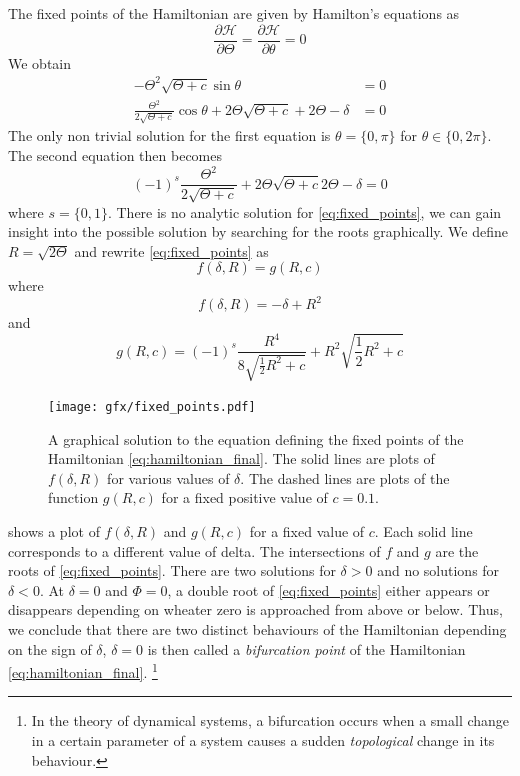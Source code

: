 \documentclass[ twoside,openright,titlepage,numbers=noenddot,headinclude,%
                footinclude=true,cleardoublepage=empty,abstractoff, %
                BCOR=5mm,paper=a4,fontsize=11pt,%
                american,%
                ]{scrreprt}
\begin{document}
The fixed points of the Hamiltonian are given by Hamilton's equations
as
\begin{equation}
    \frac{\partial \mathcal{H}}{\partial\Theta} = 
    \frac{\partial\mathcal{H}}{\partial\theta}=0
\end{equation}
We obtain 
\begin{align}
    -\Theta^2\sqrt{\Theta +c}\sin\theta&=0\\
     \frac{\Theta^2}{2\sqrt{\Theta + c}}\cos\theta +2\Theta\sqrt{\Theta+c}
    +2\Theta-\delta&=0
    \label{eq:saddle_point}
\end{align}
The only non trivial solution for the first equation is $\theta=\{0,\pi\}$
for $\theta\in\{0,2\pi\}$. The second equation then becomes
\begin{equation}
    (-1)^s\frac{\Theta^2}{2\sqrt{\Theta + c}} +2\Theta\sqrt{\Theta+c}
    2\Theta-\delta=0
    \label{eq:fixed_points}
\end{equation}
where $s=\{0,1\}$. There is no analytic solution for \cref{eq:fixed_points}, 
we can gain insight into the possible solution by searching for the roots
graphically. We define $R=\sqrt{2\Theta}$ and rewrite \cref{eq:fixed_points}
as
\begin{equation}
    f(\delta, R)=g(R,c)
\end{equation}
where
\begin{equation}
    f(\delta,R) = -\delta+R^2
\end{equation}
and
\begin{equation}
    g(R,c)=(-1)^s \frac{  R^4}{8\sqrt{ \frac{1}{2} R^2+c}} 
    +R^2\sqrt{ \frac{1}{2}R^2+c} 
\end{equation}
\begin{figure}[htb]
\centering
\texttt{[image: gfx/fixed\_points.pdf]}
\caption{A graphical solution to the equation defining the fixed points of
    the Hamiltonian \ref{eq:hamiltonian_final}. The solid lines are 
    plots of $f(\delta,R)$ for various values of $\delta$. The dashed
    lines are plots of the function $g(R, c)$  for a fixed positive value
    of $c=0.1$.}
\label{fig:fixed_points}
\end{figure}
 shows a plot of $f(\delta,R)$ and $g(R,c)$
for a fixed value of $c$. Each solid line corresponds to a different
value of delta. The intersections of $f$ and $g$ are the roots of 
\cref{eq:fixed_points}. There are two solutions for $\delta>0$
and no solutions for $\delta<0$. At $\delta=0$ and $\Phi=0$, a double root
of \cref{eq:fixed_points} either appears or disappears depending on wheater
zero is approached from above or below. Thus, we conclude that there are two 
distinct behaviours of the Hamiltonian depending on the sign of $\delta$,
$\delta=0$ is then called a \emph{bifurcation point} of the
Hamiltonian \ref{eq:hamiltonian_final}.
\footnote{In the theory of dynamical systems, a bifurcation occurs when a small 
change in a certain parameter of a system causes a sudden \emph{topological} 
change in its behaviour.}
\end{document}
